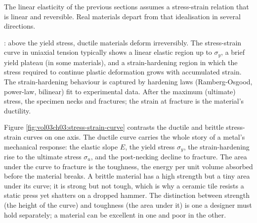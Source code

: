 The linear elasticity of the previous sections assumes a stress-strain
relation that is linear and reversible. Real materials depart from
that idealisation in several directions.

: above the yield stress, ductile materials
deform irreversibly. The stress-strain curve in uniaxial tension
typically shows a linear elastic region up to $\sigma_y$, a brief
yield plateau (in some materials), and a strain-hardening region in
which the stress required to continue plastic deformation grows with
accumulated strain. The strain-hardening behaviour is captured by
hardening laws (Ramberg-Osgood, power-law, bilinear) fit to
experimental data. After the maximum (ultimate) stress, the
specimen necks and fractures; the strain at fracture is the
material's ductility.



Figure \ref{fig:vol03ch03:stress-strain-curve} contrasts the ductile
and brittle stress-strain curves on one axis. The ductile curve carries
the whole story of a metal's mechanical response: the elastic slope $E$,
the yield stress $\sigma_y$, the strain-hardening rise to the ultimate
stress $\sigma_u$, and the post-necking decline to fracture. The area
under the curve to fracture is the toughness, the energy per unit volume
absorbed before the material breaks. A brittle material has a high
strength but a tiny area under its curve; it is strong but not tough,
which is why a ceramic tile resists a static press yet shatters on a
dropped hammer. The distinction between strength (the height of the
curve) and toughness (the area under it) is one a designer must hold
separately; a material can be excellent in one and poor in the other.

